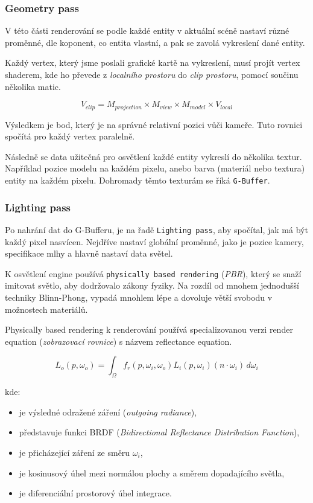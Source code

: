 \documentclass[12pt,a4paper]{article}
\begin{document}
\subsubsection{Geometry pass}
V této části renderování se podle každé entity v aktuální scéně nastaví různé proměnné, dle koponent, co entita vlastní, a pak se zavolá vykreslení dané entity.

Každý vertex, který jsme poslali grafické kartě na vykreslení, musí projít vertex shaderem, kde ho převede z \textit{localního prostoru} do \textit{clip prostoru}, pomocí součinu několika matic.

\begin{equation}
    V_{clip} = M_{projection} \times M_{view} \times M_{model} \times V_{local}
\end{equation}

Výsledkem je bod, který je na správné relativní pozici vůči kameře. Tuto rovnici spočítá pro každý vertex paralelně.

Následně se data užitečná pro osvětlení každé entity vykreslí do několika textur. Například pozice modelu na každém pixelu, anebo barva (materiál nebo textura) entity na každém pixelu. Dohromady těmto texturám se říká \texttt{G-Buffer}.

\subsubsection{Lighting pass}
Po nahrání dat do G-Bufferu, je na řadě \texttt{Lighting pass}, aby spočítal, jak má být každý pixel nasvícen. Nejdříve nastaví globální proměnné, jako je pozice kamery, specifikace mlhy a hlavně nastaví data světel.

K osvětlení engine používá \texttt{physically based rendering} \cite{learnopengl} (\textit{PBR}), který se snaží imitovat světlo, aby dodržovalo zákony fyziky. Na rozdíl od mnohem jednodušší techniky Blinn-Phong, vypadá mnohlem lépe a dovoluje větší svobodu v možnostech materiálů.

Physically based rendering k renderování používá specializovanou verzi render equation (\textit{zobrazovací rovnice}) s názvem reflectance equation.

\begin{equation} \label{eq:reflectance}
L_o(p, \omega_o) = \int_{\Omega} f_r(p, \omega_i, \omega_o) L_i(p, \omega_i) (n \cdot \omega_i) \, d\omega_i
\end{equation}

\noindent kde:
\begin{itemize}
    \item[$L_o(p, \omega_o)$] je výsledné odražené záření (\textit{outgoing radiance}),
    \item[$f_r$] představuje funkci BRDF (\textit{Bidirectional Reflectance Distribution Function}),
    \item[$L_i(p, \omega_i)$] je přicházející záření ze směru $\omega_i$,
    \item[$(n \cdot \omega_i)$] je kosinusový úhel mezi normálou plochy a směrem dopadajícího světla,
    \item[$d\omega_i$] je diferenciální prostorový úhel integrace.
\end{itemize}
\end{document}
